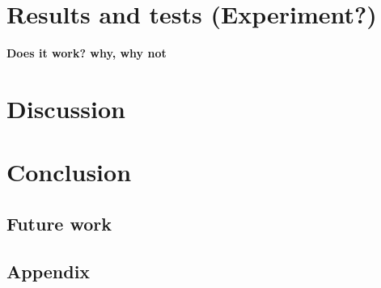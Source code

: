 \documentclass[a4paper]{report}
\begin{document}
\chapter{Results and tests (Experiment?)}
\textbf{Does it work? why, why not}
\chapter{Discussion}

\chapter{Conclusion}
\section{Future work}

\newpage



\section{Appendix}
\end{document}
